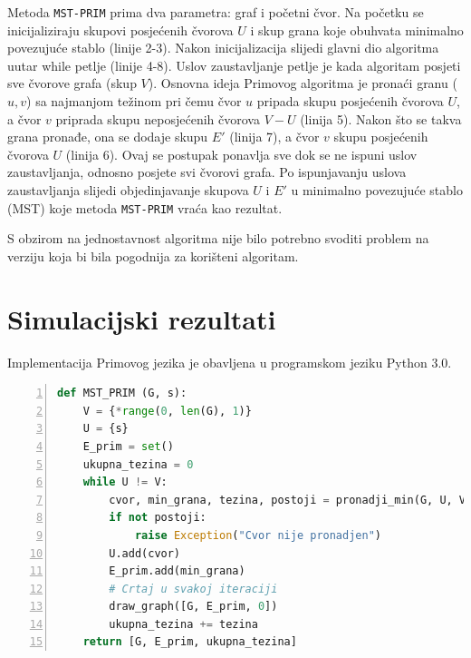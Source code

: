 \documentclass[conference]{IEEEtran}
\begin{document}
Metoda \texttt{MST-PRIM} prima dva parametra: graf i početni čvor. Na početku se inicijaliziraju skupovi posjećenih čvorova $U$ i skup grana koje obuhvata minimalno povezujuće stablo (linije 2-3). Nakon inicijalizacija slijedi glavni dio algoritma uutar while petlje (linije 4-8). Uslov zaustavljanje petlje je kada algoritam posjeti sve čvorove grafa (skup $V$). Osnovna ideja Primovog algoritma je pronaći granu ($u, v$) sa najmanjom težinom pri čemu čvor $u$ pripada skupu posjećenih čvorova $U$, a čvor $v$ priprada skupu neposjećenih čvorova $V-U$ (linija 5). Nakon što se takva grana pronađe, ona se dodaje skupu $E'$ (linija 7), a čvor $v$ skupu posjećenih čvorova $U$ (linija 6). Ovaj se postupak ponavlja sve dok se ne ispuni uslov zaustavljanja, odnosno posjete svi čvorovi grafa. Po ispunjavanju uslova zaustavljanja slijedi objedinjavanje skupova $U$ i $E'$ u minimalno povezujuće stablo (MST) koje metoda \texttt{MST-PRIM} vraća kao rezultat.

S obzirom na jednostavnost algoritma nije bilo potrebno svoditi problem na verziju koja bi bila pogodnija za korišteni algoritam.





\section{Simulacijski rezultati}
Implementacija Primovog jezika je obavljena u programskom jeziku Python 3.0. 

\begin{lstlisting}[frame=single,language=Python,numbers=left, numberstyle=\tiny, xleftmargin=0.02\textwidth, xrightmargin=0\textwidth, basicstyle=\ttfamily\small, caption=\texttt{MST\_PRIM} metoda u Python-u]
def MST_PRIM (G, s):
    V = {*range(0, len(G), 1)}
    U = {s}
    E_prim = set()
    ukupna_tezina = 0
    while U != V:
        cvor, min_grana, tezina, postoji = pronadji_min(G, U, V)
        if not postoji:
            raise Exception("Cvor nije pronadjen")
        U.add(cvor)
        E_prim.add(min_grana)
        # Crtaj u svakoj iteraciji
        draw_graph([G, E_prim, 0])
        ukupna_tezina += tezina
    return [G, E_prim, ukupna_tezina]
\end{lstlisting}
\end{document}
